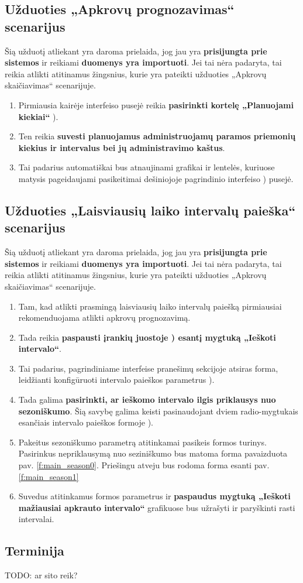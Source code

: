 

\subsection{Užduoties „Apkrovų prognozavimas“ scenarijus}
Šią užduotį atliekant yra daroma prielaida, jog jau yra \textbf{prisijungta prie sistemos} ir reikiami \textbf{duomenys yra importuoti}. Jei tai nėra padaryta, tai reikia atlikti atitinamus žingsnius, kurie yra pateikti užduoties „Apkrovų skaičiavimas“ scenarijuje.

\begin{enumerate}
  \item Pirmiausia kairėje interfeiso pusejė reikia \textbf{pasirinkti kortelę „Planuojami kiekiai“} ).
  \item Ten reikia \textbf{suvesti planuojamus administruojamų paramos priemonių kiekius ir intervalus bei jų administravimo kaštus}.
  \item Tai padarius automatiškai bus atnaujinami grafikai ir lentelės, kuriuose matysis pageidaujami pasikeitimai dešiniojoje pagrindinio interfeiso ) pusejė.
\end{enumerate}


\subsection{Užduoties „Laisviausių laiko intervalų paieška“ scenarijus}
Šią užduotį atliekant yra daroma prielaida, jog jau yra \textbf{prisijungta prie sistemos} ir reikiami \textbf{duomenys yra importuoti}. Jei tai nėra padaryta, tai reikia atlikti atitinamus žingsnius, kurie yra pateikti užduoties „Apkrovų skaičiavimas“ scenarijuje.

\begin{enumerate}
  \item Tam, kad atlikti prasmingą laisviausių laiko intervalų paiešką pirmiausiai rekomenduojama atlikti apkrovų prognozavimą.
  \item Tada reikia \textbf{paspausti įrankių juostoje ) esantį mygtuką „Ieškoti intervalo“}.
  \item Tai padarius, pagrindiniame interfeise pranešimų sekcijoje atsiras forma, leidžianti konfigūruoti intervalo paieškos parametrus ).
  \item Tada galima \textbf{pasirinkti, ar ieškomo intervalo ilgis priklausys nuo sezoniškumo}. Šią savybę galima keisti pasinaudojant dviem radio-mygtukais esančiais intervalo paieškos formoje ).
  \item Pakeitus sezoniškumo parametrą atitinkamai pasikeis formos turinys. Pasirinkus nepriklausymą nuo seziniškumo bus matoma forma pavaizduota pav. \ref{f:main_season0}. Priešingu atveju bus rodoma forma esanti pav. \ref{f:main_season1}
  \item Suvedus atitinkamus formos parametrus ir \textbf{paspaudus mygtuką „Ieškoti mažiausiai apkrauto intervalo“} grafikuose bus užrašyti ir paryškinti rasti intervalai.
\end{enumerate}


\subsection{Terminija}
TODO: ar sito reik?
